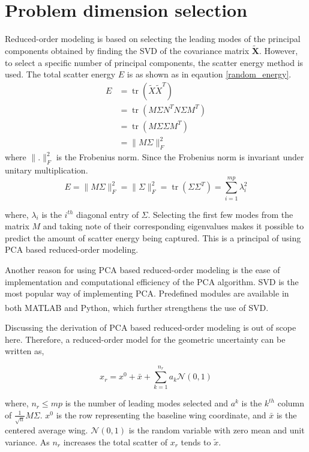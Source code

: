 \section{Problem dimension selection}

Reduced-order modeling is based on selecting the leading modes of the principal components obtained by finding the SVD of the covariance matrix $\tilde{\textbf{X}}$. However, to select a specific number of principal components, the scatter energy method is used. The total scatter energy $E$ is as shown as in eqaution \ref{random_energy}.
\begin{equation}\begin{aligned}
E &=\operatorname{tr}\left(\tilde{X} \tilde{X}^{T}\right) \\
&=\operatorname{tr}\left(M \Sigma N^{T} N \Sigma M^{T}\right) \\
&=\operatorname{tr}\left(M \Sigma \Sigma M^{T}\right) \\
&=\|M \Sigma\|_{F}^{2}
\end{aligned}
\label{random_energy}
\end{equation}
where $\|.\|_{F}^{2}$ is the Frobenius norm. Since the Frobenius norm is invariant under unitary multiplication.
$$E=\|M \Sigma\|_{F}^{2}=\|\Sigma\|_{F}^{2}=\operatorname{tr}\left(\Sigma \Sigma^{T}\right)=\sum_{i=1}^{m p} \lambda_{i}^{2}$$

where, $\lambda_i$ is the $i^{th}$ diagonal entry of $\Sigma$. Selecting the first few modes from the matrix $M$ and taking note of their corresponding eigenvalues makes it possible to predict the amount of scatter energy being captured. This is a principal of using PCA based reduced-order modeling.

Another reason for using PCA based reduced-order modeling is the ease of implementation and computational efficiency of the PCA algorithm. SVD is the most popular way of implementing PCA. Predefined modules are available in both MATLAB\textsuperscript{\textregistered} and Python, which further strengthens the use of SVD.

Discussing the derivation of PCA based reduced-order modeling is out of scope here. Therefore, a reduced-order model for the geometric uncertainty can be written as,

\begin{equation}
x_{r}=x^{0}+\bar{x}+\sum_{k=1}^{n_{r}} a_{k} \mathcal{N}(0,1)
\label{reduced-order}
\end{equation}

where, $n_r \leq mp$ is the number of leading modes selected and $a^k$ is the $k^{th}$ column of $\frac{1}{\sqrt{n}}M\Sigma$. $x^0$ is the row representing the baseline wing coordinate, and $\bar{x}$ is the centered average wing. $\mathcal{N}(0,1)$ is the random variable with zero mean and unit variance. As $n_r$ increases the total scatter of $x_r$ tends to $\tilde{x}$. 

